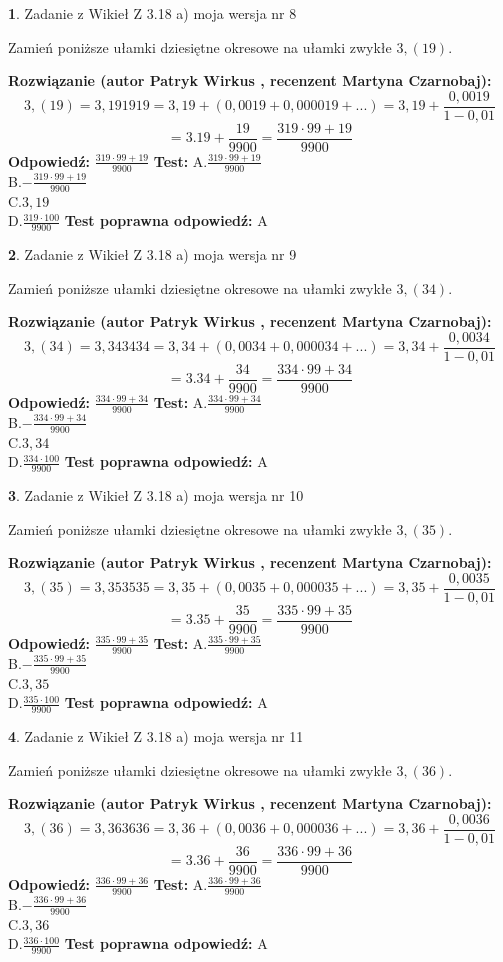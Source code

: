 \documentclass[12pt, a4paper]{article}
\theoremstyle{definition} %
\newtheorem{zad}{}
\newcommand{\zadStart}[1]{\begin{zad}#1\newline}
\newcommand{\zadStop}{\end{zad}}
\newcommand{\rozwStart}[2]{\noindent \textbf{Rozwiązanie (autor #1 , recenzent #2): }\newline}
\newcommand{\rozwStop}{\newline}
\newcommand{\odpStart}{\noindent \textbf{Odpowiedź:}\newline}
\newcommand{\odpStop}{\newline}
\newcommand{\testStart}{\noindent \textbf{Test:}\newline}
\newcommand{\testStop}{\newline}
\newcommand{\kluczStart}{\noindent \textbf{Test poprawna odpowiedź:}\newline}
\newcommand{\kluczStop}{\newline}
\begin{document}
\zadStart{Zadanie z Wikieł Z 3.18 a) moja wersja nr 8}

Zamień poniższe ułamki dziesiętne okresowe na ułamki zwykłe $3,(19)$.
\zadStop
\rozwStart{Patryk Wirkus}{Martyna Czarnobaj}
$$3,(19)=3,191919=3,19+(0,0019+0,000019+...)=3,19+\frac{0,0019}{1-0,01}$$
$$=3.19+\frac{19}{9900}=\frac{319\cdot99+19}{9900}$$
\rozwStop
\odpStart
$\frac{319\cdot99+19}{9900}$
\odpStop
\testStart
A.$\frac{319\cdot99+19}{9900}$\\ B.$-\frac{319\cdot99+19}{9900}$\\ C.$3,19$\\ D.$\frac{319\cdot100}{9900}$
\testStop
\kluczStart
A
\kluczStop



\zadStart{Zadanie z Wikieł Z 3.18 a) moja wersja nr 9}

Zamień poniższe ułamki dziesiętne okresowe na ułamki zwykłe $3,(34)$.
\zadStop
\rozwStart{Patryk Wirkus}{Martyna Czarnobaj}
$$3,(34)=3,343434=3,34+(0,0034+0,000034+...)=3,34+\frac{0,0034}{1-0,01}$$
$$=3.34+\frac{34}{9900}=\frac{334\cdot99+34}{9900}$$
\rozwStop
\odpStart
$\frac{334\cdot99+34}{9900}$
\odpStop
\testStart
A.$\frac{334\cdot99+34}{9900}$\\ B.$-\frac{334\cdot99+34}{9900}$\\ C.$3,34$\\ D.$\frac{334\cdot100}{9900}$
\testStop
\kluczStart
A
\kluczStop



\zadStart{Zadanie z Wikieł Z 3.18 a) moja wersja nr 10}

Zamień poniższe ułamki dziesiętne okresowe na ułamki zwykłe $3,(35)$.
\zadStop
\rozwStart{Patryk Wirkus}{Martyna Czarnobaj}
$$3,(35)=3,353535=3,35+(0,0035+0,000035+...)=3,35+\frac{0,0035}{1-0,01}$$
$$=3.35+\frac{35}{9900}=\frac{335\cdot99+35}{9900}$$
\rozwStop
\odpStart
$\frac{335\cdot99+35}{9900}$
\odpStop
\testStart
A.$\frac{335\cdot99+35}{9900}$\\ B.$-\frac{335\cdot99+35}{9900}$\\ C.$3,35$\\ D.$\frac{335\cdot100}{9900}$
\testStop
\kluczStart
A
\kluczStop



\zadStart{Zadanie z Wikieł Z 3.18 a) moja wersja nr 11}

Zamień poniższe ułamki dziesiętne okresowe na ułamki zwykłe $3,(36)$.
\zadStop
\rozwStart{Patryk Wirkus}{Martyna Czarnobaj}
$$3,(36)=3,363636=3,36+(0,0036+0,000036+...)=3,36+\frac{0,0036}{1-0,01}$$
$$=3.36+\frac{36}{9900}=\frac{336\cdot99+36}{9900}$$
\rozwStop
\odpStart
$\frac{336\cdot99+36}{9900}$
\odpStop
\testStart
A.$\frac{336\cdot99+36}{9900}$\\ B.$-\frac{336\cdot99+36}{9900}$\\ C.$3,36$\\ D.$\frac{336\cdot100}{9900}$
\testStop
\kluczStart
A
\kluczStop
\end{document}

